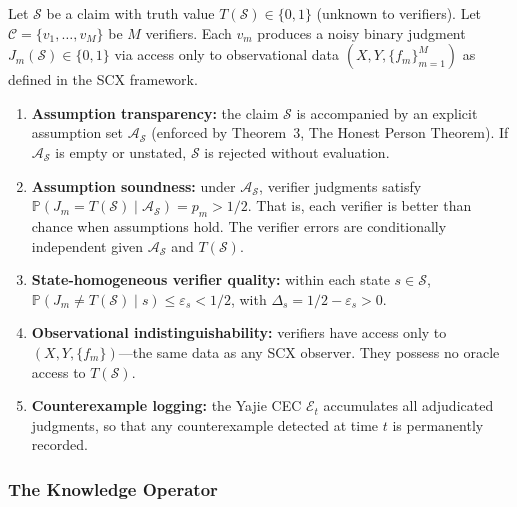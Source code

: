 \begin{definition}
\label{def:verification-framework}
Let $\mathcal{S}$ be a claim with truth value $T(\mathcal{S})\in\{0,1\}$
(unknown to verifiers). Let $\mathcal{C}=\{v_1,\ldots,v_M\}$ be $M$
verifiers. Each $v_m$ produces a noisy binary judgment
$J_m(\mathcal{S})\in\{0,1\}$ via access only to observational data
$(X,Y,\{f_m\}_{m=1}^M)$ as defined in the SCX framework.
\end{definition}

\begin{assumption}
\label{ax:epistemic}
\begin{enumerate}[label=\textbf{E\arabic*}, leftmargin=*, itemsep=4pt]
  \item \textbf{Assumption transparency:} the claim $\mathcal{S}$ is
    accompanied by an explicit assumption set $\mathcal{A}_{\mathcal{S}}$
    (enforced by Theorem~3, The Honest Person Theorem). If $\mathcal{A}_{\mathcal{S}}$
    is empty or unstated, $\mathcal{S}$ is rejected without evaluation.
  \item \textbf{Assumption soundness:} under $\mathcal{A}_{\mathcal{S}}$,
    verifier judgments satisfy
    $\mathbb{P}(J_m = T(\mathcal{S}) \mid \mathcal{A}_{\mathcal{S}}) = p_m > 1/2$.
    That is, each verifier is better than chance when assumptions hold.
    The verifier errors are conditionally independent given
    $\mathcal{A}_{\mathcal{S}}$ and $T(\mathcal{S})$.
  \item \textbf{State-homogeneous verifier quality:} within each state
    $s\in\mathcal{S}$, $\mathbb{P}(J_m \neq T(\mathcal{S}) \mid s) \leq
    \varepsilon_s < 1/2$, with $\Delta_s = 1/2 - \varepsilon_s > 0$.
  \item \textbf{Observational indistinguishability:} verifiers have access
    only to $(X,Y,\{f_m\})$---the same data as any SCX observer. They
    possess no oracle access to $T(\mathcal{S})$.
  \item \textbf{Counterexample logging:} the Yajie CEC $\mathcal{E}_t$
    accumulates all adjudicated judgments, so that any counterexample
    detected at time $t$ is permanently recorded.
\end{enumerate}
\end{assumption}

\subsubsection{The Knowledge Operator}
\label{sec:knowledge-operator}

